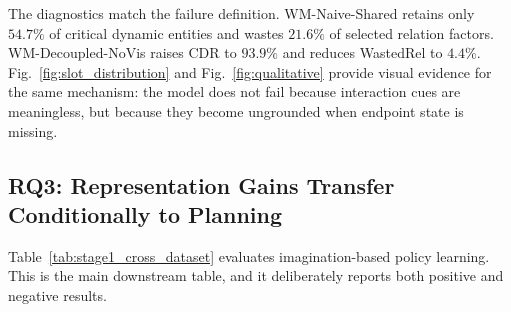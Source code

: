 \documentclass[journal]{IEEEtran}
\begin{document}
The diagnostics match the failure definition. WM-Naive-Shared retains only $54.7\%$ of critical dynamic entities and wastes $21.6\%$ of selected relation factors. WM-Decoupled-NoVis raises CDR to $93.9\%$ and reduces WastedRel to $4.4\%$. Fig.~\ref{fig:slot_distribution} and Fig.~\ref{fig:qualitative} provide visual evidence for the same mechanism: the model does not fail because interaction cues are meaningless, but because they become ungrounded when endpoint state is missing.

\subsection{RQ3: Representation Gains Transfer Conditionally to Planning}
Table~\ref{tab:stage1_cross_dataset} evaluates imagination-based policy learning. This is the main downstream table, and it deliberately reports both positive and negative results.
\end{document}
